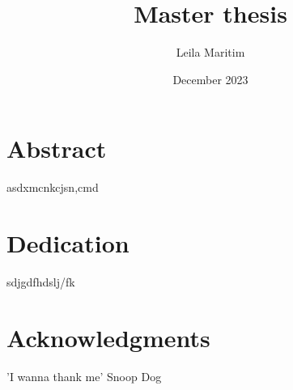 \documentclass[twoside]{report}
\title{Master thesis}
\author{Leila Maritim}
\date{December 2023}
\begin{document}
\maketitle
\chapter*{Abstract}
asdxmcnkcjsn,cmd

\chapter*{Dedication}
sdjgdfhdslj/fk

\chapter*{Acknowledgments}
'I wanna thank me' Snoop Dog 
\tableofcontents
\listoffigures







\appendix




\end{document}
